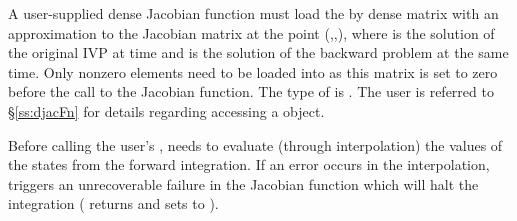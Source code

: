 {
  A user-supplied dense Jacobian function must load the  by 
  dense matrix  with an approximation to the Jacobian matrix
  at the point (,,), where  is the solution
  of the original IVP at time  and  is the solution of the
  backward problem at the same time.
  Only nonzero elements need to be loaded into  as this matrix 
  is set to zero before the call to the Jacobian function. 
  The type of  is . The user is referred to 
  \S\ref{ss:djacFn} for details regarding accessing a  object.

  {\warn}Before calling the user's , {\cvodes} needs to evaluate
  (through interpolation) the values of the states from the forward integration. 
  If an error occurs in the interpolation, {\cvodes} triggers an unrecoverable
  failure in the Jacobian function which will halt the integration
  ( returns  and {\cvdense} sets  to 
  ).
}

